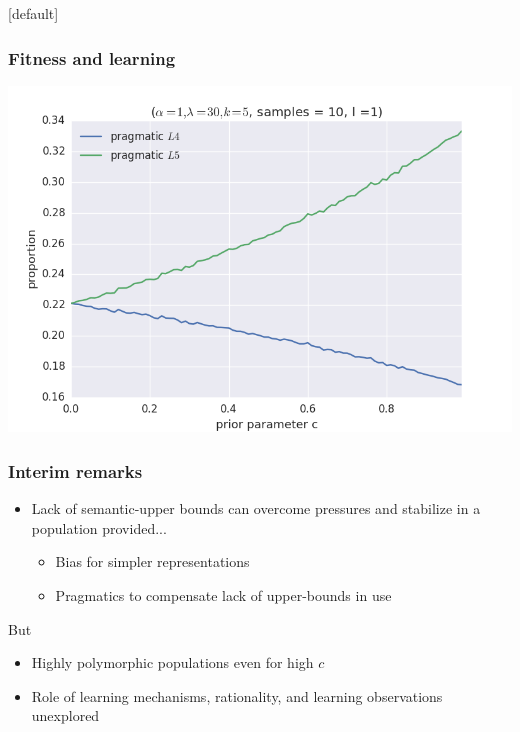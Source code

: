 \documentclass{beamer} %
\makeatletter
\newenvironment{withoutheadline}{
        \setbeamertemplate{headline}[default]
        \def\beamer@entrycode{\vspace*{-\headheight}}
    }{}
\makeatother
\begin{document}
\begin{withoutheadline}
\begin{frame}
\end{frame}

\begin{frame}
	\frametitle{Fitness and learning}

\includegraphics[width=\linewidth,height=\textheight,keepaspectratio]{03cost-with-l1}

\end{frame}

\begin{frame}
  \frametitle{Interim remarks}
  \begin{itemize}
	\item Lack of semantic-upper bounds can overcome pressures and stabilize in a population provided...
	  \begin{itemize}
		\item Bias for simpler representations
		\item Pragmatics to compensate lack of upper-bounds in use
	  \end{itemize}
  \end{itemize}
  But

  \begin{itemize}
    \item Highly polymorphic populations even for high $c$
    \item Role of learning mechanisms, rationality, and learning observations unexplored
  \end{itemize}

\end{frame}


\end{withoutheadline}
\end{document}
